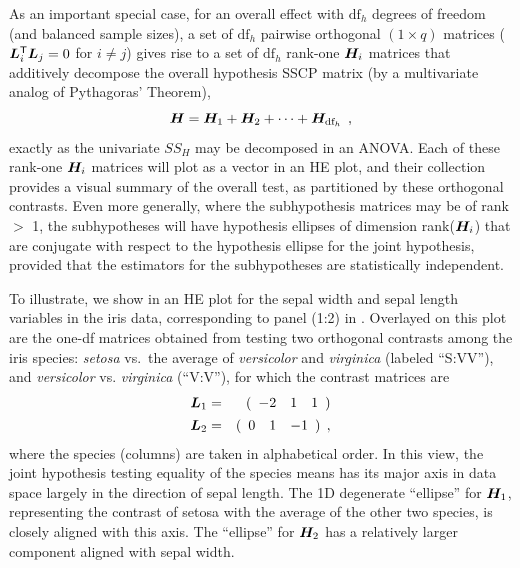 As an important special case,
for an overall effect with
$\textrm{df}_h$ degrees of freedom (and balanced sample sizes), a set of $\textrm{df}_h$ pairwise orthogonal $(1 \times q)$
 matrices ($\bm{L}_i ^\mathsf{T} \bm{L}_j =0$ for $i\ne j$) gives rise to a set of $\textrm{df}_h$ rank-one $\bm{H}_i$
matrices that additively decompose the overall hypothesis SSCP matrix (by a multivariate analog of Pythagoras' Theorem),
\begin{equation*}
\bm{H} = \bm{H}_1 + \bm{H}_2 + \cdots + \bm{H}_{\textrm{df}_h}
\:\: ,
\end{equation*}
exactly as the univariate $SS_H$ may be decomposed in an ANOVA.  Each of these rank-one $\bm{H}_i$ matrices
will plot as a vector in an HE plot, and their collection provides a visual summary of the overall
test, as partitioned by these orthogonal contrasts.
Even more generally, where the subhypothesis matrices may be of rank $>$ 1,  the subhypotheses will have hypothesis ellipses of dimension rank($\bm{H}_i$)
that are conjugate with respect to the hypothesis ellipse for the joint hypothesis, provided that the
estimators for the subhypotheses are statistically independent.


To illustrate, we show in  an HE plot for the sepal width and sepal length variables in the iris data,
corresponding to panel (1:2) in . Overlayed on this plot are the
one-df  matrices obtained from testing two orthogonal contrasts among the iris species:
\emph{setosa} vs.\ the average of \emph{versicolor} and \emph{virginica} (labeled ``S:VV''), and \emph{versicolor} vs. \emph{virginica} (``V:V''), for which the contrast matrices are
\begin{eqnarray*}
\bm{L}_1 & = &
( \begin{array}{rrr}
-2 & 1 & 1
\end{array} )
\\
\bm{L}_2 & = &
( \begin{array}{rrr}
0 & 1 & -1
\end{array} ) \:\: ,
\end{eqnarray*}
where the species (columns) are taken in alphabetical order. In this view, the joint hypothesis testing
equality of the species means has its major axis in data space largely in the direction of sepal length.
The 1D degenerate ``ellipse'' for $\bm{H}_1$, representing the contrast of setosa with the average of the other two species,
is closely aligned with this axis. The ``ellipse'' for $\bm{H}_2$ has a relatively larger component aligned
with sepal width.

